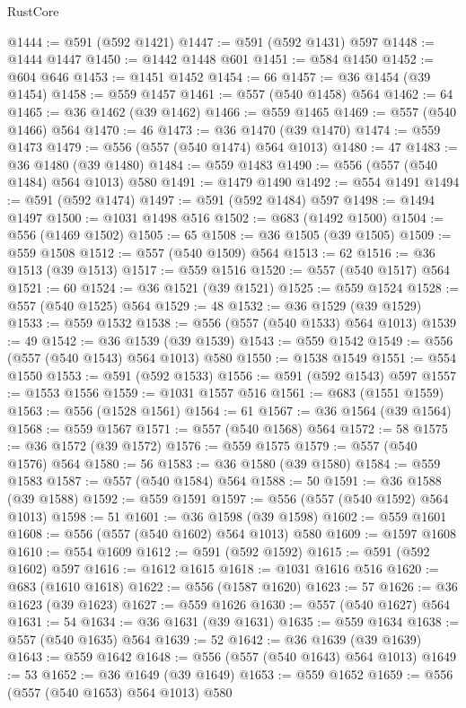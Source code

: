 \begin{lexlean}{RustCore}
\begin{coremodule}
@1444 := @591 (@592 @1421)
@1447 := @591 (@592 @1431) @597
@1448 := @1444 @1447
@1450 := @1442 @1448 @601
@1451 := @584 @1450
@1452 := @604 @646
@1453 := @1451 @1452
@1454 := 66
@1457 := @36 @1454 (@39 @1454)
@1458 := @559 @1457
@1461 := @557 (@540 @1458) @564
@1462 := 64
@1465 := @36 @1462 (@39 @1462)
@1466 := @559 @1465
@1469 := @557 (@540 @1466) @564
@1470 := 46
@1473 := @36 @1470 (@39 @1470)
@1474 := @559 @1473
@1479 := @556 (@557 (@540 @1474) @564 @1013)
@1480 := 47
@1483 := @36 @1480 (@39 @1480)
@1484 := @559 @1483
@1490 := @556 (@557 (@540 @1484) @564 @1013) @580
@1491 := @1479 @1490
@1492 := @554 @1491
@1494 := @591 (@592 @1474)
@1497 := @591 (@592 @1484) @597
@1498 := @1494 @1497
@1500 := @1031 @1498 @516
@1502 := @683 (@1492 @1500)
@1504 := @556 (@1469 @1502)
@1505 := 65
@1508 := @36 @1505 (@39 @1505)
@1509 := @559 @1508
@1512 := @557 (@540 @1509) @564
@1513 := 62
@1516 := @36 @1513 (@39 @1513)
@1517 := @559 @1516
@1520 := @557 (@540 @1517) @564
@1521 := 60
@1524 := @36 @1521 (@39 @1521)
@1525 := @559 @1524
@1528 := @557 (@540 @1525) @564
@1529 := 48
@1532 := @36 @1529 (@39 @1529)
@1533 := @559 @1532
@1538 := @556 (@557 (@540 @1533) @564 @1013)
@1539 := 49
@1542 := @36 @1539 (@39 @1539)
@1543 := @559 @1542
@1549 := @556 (@557 (@540 @1543) @564 @1013) @580
@1550 := @1538 @1549
@1551 := @554 @1550
@1553 := @591 (@592 @1533)
@1556 := @591 (@592 @1543) @597
@1557 := @1553 @1556
@1559 := @1031 @1557 @516
@1561 := @683 (@1551 @1559)
@1563 := @556 (@1528 @1561)
@1564 := 61
@1567 := @36 @1564 (@39 @1564)
@1568 := @559 @1567
@1571 := @557 (@540 @1568) @564
@1572 := 58
@1575 := @36 @1572 (@39 @1572)
@1576 := @559 @1575
@1579 := @557 (@540 @1576) @564
@1580 := 56
@1583 := @36 @1580 (@39 @1580)
@1584 := @559 @1583
@1587 := @557 (@540 @1584) @564
@1588 := 50
@1591 := @36 @1588 (@39 @1588)
@1592 := @559 @1591
@1597 := @556 (@557 (@540 @1592) @564 @1013)
@1598 := 51
@1601 := @36 @1598 (@39 @1598)
@1602 := @559 @1601
@1608 := @556 (@557 (@540 @1602) @564 @1013) @580
@1609 := @1597 @1608
@1610 := @554 @1609
@1612 := @591 (@592 @1592)
@1615 := @591 (@592 @1602) @597
@1616 := @1612 @1615
@1618 := @1031 @1616 @516
@1620 := @683 (@1610 @1618)
@1622 := @556 (@1587 @1620)
@1623 := 57
@1626 := @36 @1623 (@39 @1623)
@1627 := @559 @1626
@1630 := @557 (@540 @1627) @564
@1631 := 54
@1634 := @36 @1631 (@39 @1631)
@1635 := @559 @1634
@1638 := @557 (@540 @1635) @564
@1639 := 52
@1642 := @36 @1639 (@39 @1639)
@1643 := @559 @1642
@1648 := @556 (@557 (@540 @1643) @564 @1013)
@1649 := 53
@1652 := @36 @1649 (@39 @1649)
@1653 := @559 @1652
@1659 := @556 (@557 (@540 @1653) @564 @1013) @580

\end{coremodule}
\end{lexlean}
